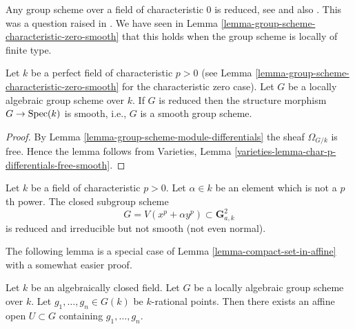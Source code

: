 \begin{remark}
\label{remark-when-reduced}
Any group scheme over a field of characteristic $0$ is reduced, see
\cite[I, Theorem 1.1 and I, Corollary 3.9, and II, Theorem 2.4]{Perrin-thesis}
and also
\cite[Proposition 4.2.8]{Perrin}.
This was a question raised in
\cite[page 80]{Oort}.
We have seen in
Lemma \ref{lemma-group-scheme-characteristic-zero-smooth}
that this holds when the group scheme is locally of finite type.
\end{remark}

\begin{lemma}
\label{lemma-reduced-group-scheme-prefect-field-characteristic-p-smooth}
Let $k$ be a perfect field of characteristic $p > 0$ (see
Lemma \ref{lemma-group-scheme-characteristic-zero-smooth}
for the characteristic zero case).
Let $G$ be a locally algebraic group scheme over $k$.
If $G$ is reduced then the structure
morphism $G \to \mathop{\mathrm{Spec}}(k)$ is smooth, i.e., $G$ is a smooth
group scheme.
\end{lemma}

\begin{proof}
By
Lemma \ref{lemma-group-scheme-module-differentials}
the sheaf $\Omega_{G/k}$ is free. Hence the lemma follows from
Varieties, Lemma \ref{varieties-lemma-char-p-differentials-free-smooth}.
\end{proof}

\begin{remark}
\label{remark-reduced-smooth-not-true-general}
Let $k$ be a field of characteristic $p > 0$.
Let $\alpha \in k$ be an element which is not a $p$th power.
The closed subgroup scheme
$$
G = V(x^p + \alpha y^p) \subset \mathbf{G}_{a, k}^2
$$
is reduced and irreducible but not smooth (not even normal).
\end{remark}

\noindent
The following lemma is a special case of
Lemma \ref{lemma-compact-set-in-affine}
with a somewhat easier proof.

\begin{lemma}
\label{lemma-points-in-affine}
Let $k$ be an algebraically closed field.
Let $G$ be a locally algebraic group scheme over $k$.
Let $g_1, \ldots, g_n \in G(k)$ be $k$-rational points.
Then there exists an affine open $U \subset G$ containing $g_1, \ldots, g_n$.
\end{lemma}

